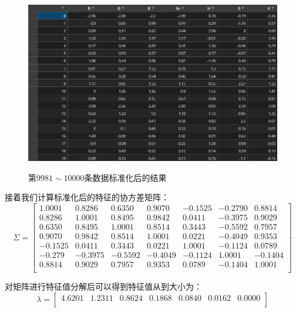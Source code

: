 \documentclass[UTF8]{ctexart}
\begin{document}
	\begin{figure}[htbp]
		\centering
		\caption{第$9981\sim10000$条数据标准化后的结果}
		\includegraphics[width=1.0\textwidth]{data_standard1.png}
		\label{Fig.30}
	\end{figure}
	
	接着我们计算标准化后的特征的协方差矩阵：
	\begin{equation*}
	\Sigma = 
	\begin{bmatrix}
	1.0001 & 0.8286 & 0.6350 &  0.9070 &  -0.1525 &-0.2790  & 0.8814  \\
	0.8286 & 1.0001 & 0.8495 & 0.9842 & 0.0411& -0.3975 & 0.9029  \\
	0.6350  & 0.8495 & 1.0001 & 0.8514 & 0.3443& -0.5592 & 0.7957  \\ 
	0.9070  & 0.9842 & 0.8514 & 1.0001& 0.0221 &-0.4049 & 0.9353  \\
	-0.1525 & 0.0411 & 0.3443 & 0.0221 & 1.0001& -0.1124 & 0.0789  \\
	-0.279 & -0.3975 &-0.5592 &-0.4049 &-0.1124 & 1.0001& -0.1404  \\
	0.8814 & 0.9029 & 0.7957 & 0.9353 & 0.0789 &-0.1404 & 1.0001  \\
	\end{bmatrix}
	\end{equation*}
	
	对矩阵进行特征值分解后可以得到特征值从到大小为：
	\begin{equation*}
	\hat{\lambda} = 
	\begin{bmatrix}
	4.6201 & 1.2311 & 0.8624 & 0.1868 & 0.0840 & 0.0162 & 0.0000 \\
	\end{bmatrix}
	\end{equation*}
	
\end{document}
